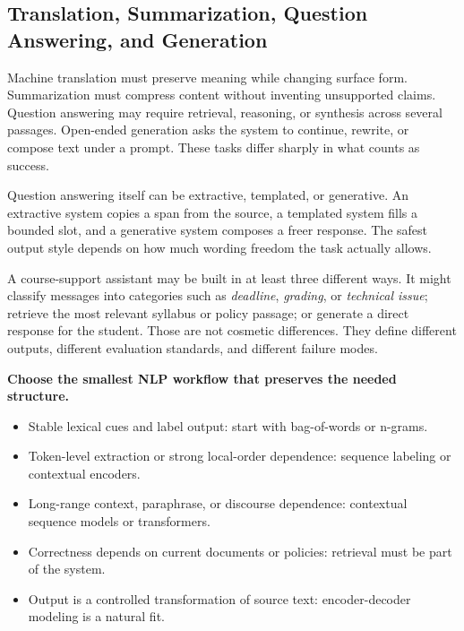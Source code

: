 \subsection{Translation, Summarization, Question Answering, and Generation}

Machine translation must preserve meaning while changing surface form. Summarization must compress content without inventing unsupported claims. Question answering may require retrieval, reasoning, or synthesis across several passages. Open-ended generation asks the system to continue, rewrite, or compose text under a prompt. These tasks differ sharply in what counts as success.

Question answering itself can be extractive, templated, or generative. An extractive system copies a span from the source, a templated system fills a bounded slot, and a generative system composes a freer response. The safest output style depends on how much wording freedom the task actually allows.

\begin{example}
A course-support assistant may be built in at least three different ways. It might classify messages into categories such as \emph{deadline}, \emph{grading}, or \emph{technical issue}; retrieve the most relevant syllabus or policy passage; or generate a direct response for the student. Those are not cosmetic differences. They define different outputs, different evaluation standards, and different failure modes.
\end{example}

\begin{decisionbox}
\textbf{Choose the smallest NLP workflow that preserves the needed structure.}
\begin{itemize}[leftmargin=*]
\item Stable lexical cues and label output: start with bag-of-words or n-grams.
\item Token-level extraction or strong local-order dependence: sequence labeling or contextual encoders.
\item Long-range context, paraphrase, or discourse dependence: contextual sequence models or transformers.
\item Correctness depends on current documents or policies: retrieval must be part of the system.
\item Output is a controlled transformation of source text: encoder-decoder modeling is a natural fit.
\end{itemize}
\end{decisionbox}

